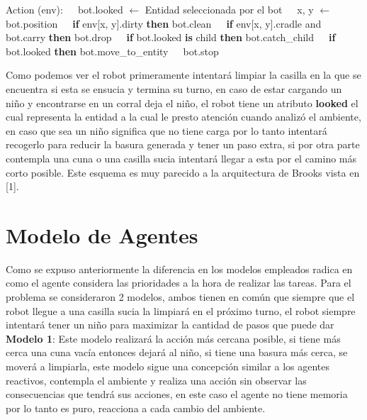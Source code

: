 \documentclass[a4paper,10pt,twocolumn]{article}
\begin{document}
\begin{algorithm}
	\begin{algorithmic}
		\STATE Action (env):
		\STATE $\;\;\;$ bot.looked $\leftarrow$ Entidad seleccionada por el bot
		\STATE $\;\;\;$ x, y $\leftarrow$ bot.position 
		\STATE $\;\;\;$ \textbf{if} env[x, y].dirty \textbf{then} bot.clean
		\STATE $\;\;\;$ \textbf{if} env[x, y].cradle and bot.carry \textbf{then} bot.drop
		\STATE $\;\;\;$ \textbf{if} bot.looked \textbf{is} child \textbf{then} bot.catch\_child
		\STATE $\;\;\;$ \textbf{if} bot.looked \textbf{then} bot.move\_to\_entity
		\STATE $\;\;\;$ bot.stop
	\end{algorithmic}
\end{algorithm}

Como podemos ver el robot primeramente intentar\'a limpiar la casilla en la que se encuentra si esta se ensucia y termina su turno, en caso de estar cargando un ni\~no y encontrarse en un corral deja el ni\~no, el robot tiene un atributo \textbf{looked} el cual representa la entidad a la cual le presto atenci\'on cuando analiz\'o el ambiente, en caso que sea un ni\~no significa que no tiene carga por lo tanto intentar\'a recogerlo para reducir la basura generada y tener un paso extra, si por otra parte contempla una cuna o una casilla sucia intentar\'a llegar a esta por el camino m\'as corto posible. Este esquema es muy parecido a la arquitectura de Brooks vista en [1].

\section*{Modelo de Agentes}

Como se expuso anteriormente la diferencia en los modelos empleados radica en como el agente considera las prioridades a la hora de realizar las tareas. Para el problema se consideraron 2 modelos, ambos tienen en com\'un que siempre que el robot llegue a una casilla sucia la limpiar\'a en el pr\'oximo turno, el robot siempre intentar\'a tener un ni\~no para maximizar la cantidad de pasos que puede dar\\

\textbf{Modelo 1}: Este modelo realizar\'a la acci\'on m\'as cercana posible, si tiene m\'as cerca una cuna vac\'ia entonces dejar\'a al ni\~no, si tiene una basura m\'as cerca, se mover\'a a limpiarla, este modelo sigue una concepci\'on similar a los agentes reactivos, contempla el ambiente y realiza una acci\'on sin observar las consecuencias que tendr\'a sus acciones, en este caso el agente no tiene memoria por lo tanto es puro, reacciona a cada cambio del ambiente.\\
\end{document}
